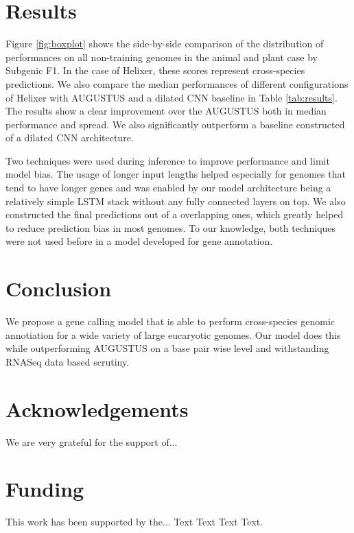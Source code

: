 \documentclass{bioinfo}
\begin{document}
\section{Results}
Figure \ref{fig:boxplot} shows the side-by-side comparison of the distribution of performances on all non-training genomes in the animal and plant case by Subgenic F1. In the case of Helixer, these scores represent cross-species predictions. We also compare the median performances of different configurations of Helixer with AUGUSTUS and a dilated CNN baseline in Table \ref{tab:results}. The results show a clear improvement over the AUGUSTUS both in median performance and spread. We also significantly outperform a baseline constructed of a dilated CNN architecture. 

Two techniques were used during inference to improve performance and limit model bias. The usage of longer input lengths helped especially for genomes that tend to have longer genes and was enabled by our model architecture being a relatively simple LSTM stack without any fully connected layers on top. We also constructed the final predictions out of a overlapping ones, which greatly helped to reduce prediction bias in most genomes. To our knowledge, both techniques were not used before in a model developed for gene annotation. 

\section{Conclusion}
We propose a gene calling model that is able to perform cross-species genomic annotiation for a wide variety of large eucaryotic genomes. Our model does this while outperforming AUGUSTUS on a base pair wise level and withstanding RNASeq data based scrutiny. 

\section*{Acknowledgements}

We are very grateful for the support of...

\section*{Funding}

This work has been supported by the... Text Text  Text Text.\vspace*{-12pt}

%
%
%
%
%
%
%
%
%
\end{document}
